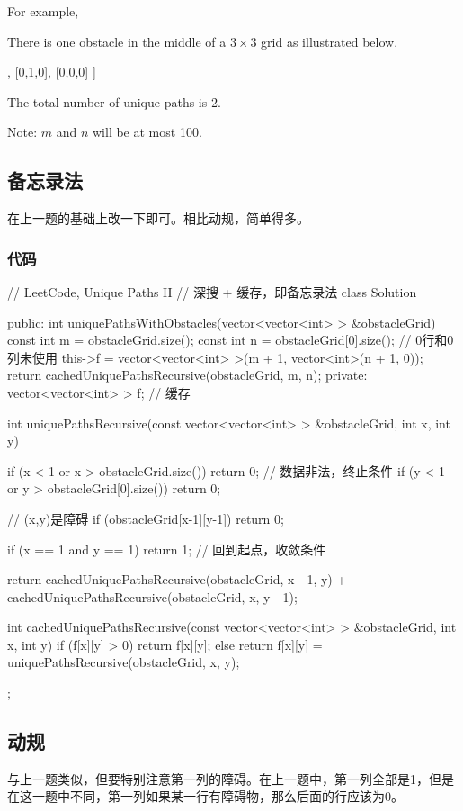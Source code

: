 For example,

There is one obstacle in the middle of a $3 \times 3$ grid as illustrated below.
\begin{Code}
[
  [0,0,0],
  [0,1,0],
  [0,0,0]
]
\end{Code}

The total number of unique paths is 2.

Note: $m$ and $n$ will be at most 100.


\subsection{备忘录法}
在上一题的基础上改一下即可。相比动规，简单得多。

\subsubsection{代码}
\begin{Code}
// LeetCode, Unique Paths II
// 深搜 + 缓存，即备忘录法
class Solution {
public:
    int uniquePathsWithObstacles(vector<vector<int> > &obstacleGrid) {
        const int m = obstacleGrid.size();
        const int n = obstacleGrid[0].size();
        // 0行和0列未使用
        this->f = vector<vector<int> >(m + 1, vector<int>(n + 1, 0));
        return cachedUniquePathsRecursive(obstacleGrid, m, n);
    }
private:
    vector<vector<int> > f;  // 缓存

    int uniquePathsRecursive(const vector<vector<int> > &obstacleGrid,
            int x, int y) {
        if (x < 1 or x > obstacleGrid.size()) return 0; // 数据非法，终止条件
        if (y < 1 or y > obstacleGrid[0].size()) return 0;

        // (x,y)是障碍
        if (obstacleGrid[x-1][y-1]) return 0;

        if (x == 1 and y == 1) return 1; // 回到起点，收敛条件

        return cachedUniquePathsRecursive(obstacleGrid, x - 1, y) +
                cachedUniquePathsRecursive(obstacleGrid, x, y - 1);
    }

    int cachedUniquePathsRecursive(const vector<vector<int> > &obstacleGrid,
            int x, int y) {
        if (f[x][y] > 0) return f[x][y];
        else return f[x][y] = uniquePathsRecursive(obstacleGrid, x, y);
    }
};
\end{Code}


\subsection{动规}
与上一题类似，但要特别注意第一列的障碍。在上一题中，第一列全部是1，但是在这一题中不同，第一列如果某一行有障碍物，那么后面的行应该为0。


